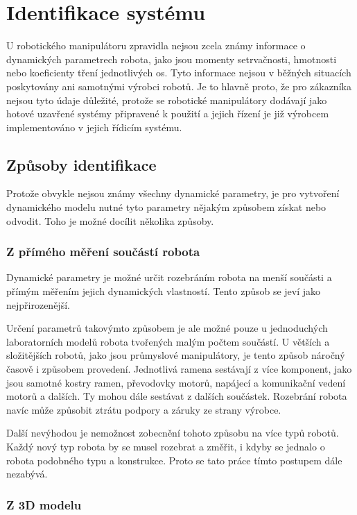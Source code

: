 

\chapter{Identifikace systému}

U robotického manipulátoru zpravidla nejsou zcela známy informace o dynamických parametrech robota, jako jsou momenty setrvačnosti, hmotnosti nebo koeficienty tření jednotlivých os. Tyto informace nejsou v běžných situacích poskytovány ani samotnými výrobci robotů. Je to hlavně proto, že pro zákazníka nejsou tyto údaje důležité, protože se robotické manipulátory dodávají jako hotové uzavřené systémy připravené k použití a jejich řízení je již výrobcem implementováno v jejich řídicím systému.

\section{Způsoby identifikace}

Protože obvykle nejsou známy všechny dynamické parametry, je pro vytvoření dynamického modelu nutné tyto parametry nějakým způsobem získat nebo odvodit. Toho je možné docílit několika způsoby.

\subsection{Z přímého měření součástí robota}

Dynamické parametry je možné určit rozebráním robota na menší součásti a přímým měřením jejich dynamických vlastností. Tento způsob se jeví jako nejpřirozenější.

Určení parametrů takovýmto způsobem je ale možné pouze u jednoduchých laboratorních modelů robota tvořených malým počtem součástí. U větších a složitějších robotů, jako jsou průmyslové manipulátory, je tento způsob náročný časově i způsobem provedení. Jednotlivá ramena sestávají z více komponent, jako jsou samotné kostry ramen, převodovky motorů, napájecí a komunikační vedení motorů a dalších. Ty mohou dále sestávat z dalších součástek. Rozebrání robota navíc může způsobit ztrátu podpory a záruky ze strany výrobce.

Další nevýhodou je nemožnost zobecnění tohoto způsobu na více typů robotů. Každý nový typ robota by se musel rozebrat a změřit, i kdyby se jednalo o robota podobného typu a konstrukce. Proto se tato práce tímto postupem dále nezabývá.    

\subsection{Z 3D modelu}

